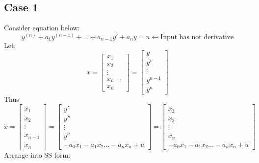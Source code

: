 \documentclass[12pt,a4paper]{article}
\begin{document}
	\subsection{Case 1}
	Consider equation below:
	\[
	y^{(n)} + a_1y^{(n-1)} + ... + a_{n-1}y' + a_n y = u  \leftarrow \text{Input has not derivative}
	\]
	Let:
	\[
	x = 
	\begin{bmatrix}
		x_1     \\
		x_2     \\
		\vdots  \\
		x_{n-1} \\
		x_n     
	\end{bmatrix}
	=
	\begin{bmatrix}
		y       \\
		y'      \\
		\vdots  \\
		y^{n-1} \\
		y^n     
	\end{bmatrix}
	\]
	Thus
	\[
	\dot{x} = 
	\begin{bmatrix}
		\dot{x}_1     \\
		\dot{x}_2     \\
		\vdots        \\
		\dot{x}_{n-1} \\
		\dot{x}_n     
	\end{bmatrix}
	=
	\begin{bmatrix}
		y'                                \\
		y''                               \\
		\vdots                            \\
		y^n                               \\
		-a_0x_1 - a_1x_2 ... - a_nx_n + u 
	\end{bmatrix}
	=
	\begin{bmatrix}
		\dot{x}_2                         \\
		\dot{x}_3                         \\
		\vdots                            \\
		\dot{x}_n                         \\
		-a_0x_1 - a_1x_2 ... - a_nx_n + u 
	\end{bmatrix}
	\]
	Arrange into SS form:
\end{document}
